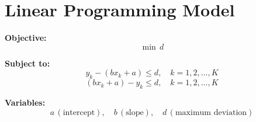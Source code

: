 \documentclass{article}
\begin{document}
\section*{Linear Programming Model}

\textbf{Objective:}
\[
\min \, d
\]

\textbf{Subject to:}
\[
y_k - (bx_k + a) \leq d, \quad k = 1, 2, \ldots, K
\]
\[
(bx_k + a) - y_k \leq d, \quad k = 1, 2, \ldots, K
\]

\textbf{Variables:}
\[
a \, (\text{intercept}), \quad b \, (\text{slope}), \quad d \, (\text{maximum deviation})
\]
\end{document}
